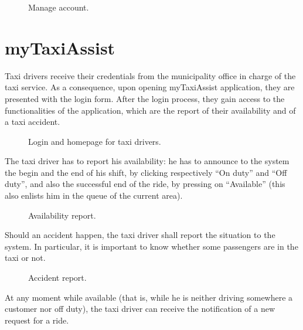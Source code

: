 \begin{figure}%
	\hfill%
	\hfill%
	\caption{Manage account.}\label{fig:manageAccount}
\end{figure}

\clearpage

\section{myTaxiAssist}
Taxi drivers receive their credentials from the municipality office in charge of the taxi service. As a consequence, upon opening myTaxiAssist application, they are presented with the login form. After the login process, they gain access to the functionalities of the application, which are the report of their availability and of a taxi accident.

\begin{figure}%
	\hfill%
	\hfill%
	\hfill%
	\caption{Login and homepage for taxi drivers.}\label{fig:homeTaxi}
\end{figure}


The taxi driver has to report his availability: he has to announce to the system the begin and the end of his shift, by clicking respectively ``On duty'' and ``Off duty'', and also the successful end of the ride, by pressing on ``Available'' (this also enlists him in the queue of the current area).

\begin{figure}%
	\hfill%
	\hfill%
	\caption{Availability report.}\label{fig:availReport}
\end{figure}


\clearpage

Should an accident happen, the taxi driver shall report the situation to the system. In particular, it is important to know whether some passengers are in the taxi or not.  

\begin{figure}%
	\hfill%
	\hfill%
	\caption{Accident report.}\label{fig:accidentReport}
\end{figure}

At any moment while available (that is, while he is neither driving somewhere a customer nor off duty), the taxi driver can receive the notification of a new request for a ride. 

